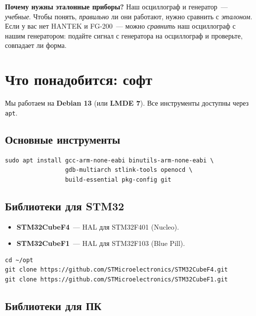 \begin{ideabox}
\textbf{Почему нужны эталонные приборы?} Наш осциллограф и
генератор~--- \emph{учебные}. Чтобы понять, \emph{правильно}
ли они работают, нужно сравнить с \emph{эталоном}. Если
у вас нет HANTEK и FG-200~--- можно \emph{сравнить} наш
осциллограф с нашим генератором: подайте сигнал с генератора
на осциллограф и проверьте, совпадает ли форма.
\end{ideabox}

\section{Что понадобится: софт}
\label{sec:intro-software}

Мы работаем на \textbf{Debian 13} (или \textbf{LMDE 7}).
Все инструменты доступны через \texttt{apt}.

\subsection{Основные инструменты}

\begin{verbatim}
sudo apt install gcc-arm-none-eabi binutils-arm-none-eabi \
                 gdb-multiarch stlink-tools openocd \
                 build-essential pkg-config git
\end{verbatim}

\subsection{Библиотеки для STM32}

\begin{itemize}
    \item \textbf{STM32CubeF4}~--- HAL для STM32F401 (Nucleo).
    \item \textbf{STM32CubeF1}~--- HAL для STM32F103 (Blue Pill).
\end{itemize}

\begin{verbatim}
cd ~/opt
git clone https://github.com/STMicroelectronics/STM32CubeF4.git
git clone https://github.com/STMicroelectronics/STM32CubeF1.git
\end{verbatim}

\subsection{Библиотеки для ПК}

